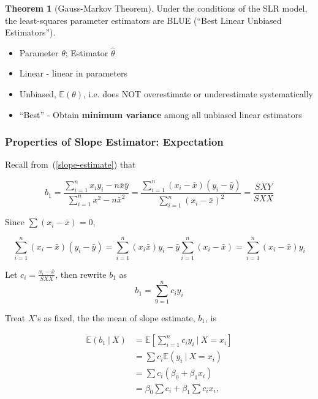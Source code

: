 \documentclass[11pt]{article}
\theoremstyle{definition}
\newtheorem{theorem}{Theorem}[section]
\numberwithin{equation}{section}
\begin{document}
\begin{theorem}[Gauss-Markov Theorem]
  Under the conditions of the SLR model, the least-squares parameter estimators are BLUE (``Best Linear Unbiased Estimators'').
  \begin{itemize}
    \item Parameter $\theta$; Estimator $\hat{\theta}$
    \item Linear - linear in parameters
    \item Unbiased, $\mathbb{E}(\theta)$, i.e. does NOT overestimate or underestimate systematically
    \item ``Best'' - Obtain \textbf{minimum variance} among all unbiased linear estimators
  \end{itemize}
\end{theorem}

\subsubsection{Properties of Slope Estimator: Expectation}

Recall from~(\ref{slope-estimate}) that

\begin{equation}
b_1 = \frac{\sum^n_{i=1}x_iy_i - n\bar{x}\bar{y}}{\sum^n_{i=1} x^2 - n\bar{x}^2}=\frac{\sum^n_{i=1}(x_i-\bar{x})(y_i-\bar{y})}{\sum^n_{i=1}(x_i-\bar{x})^2}=\frac{SXY}{SXX}
\end{equation}

Since $\sum (x_i - \bar{x}) = 0$,

\begin{equation*}
\sum^n_{i = 1} (x_i - \bar{x})(y_i - \bar{y}) = \sum^n_{i = 1}(x_i\bar{x})y_i - \bar{y}\sum^n_{i = 1}(x_i - \bar{x}) = \sum^n_{i=1}(x_i-\bar{x})y_i
\end{equation*}

Let $c_i = \frac{x_i - \bar{x}}{SXX}$, then rewrite $b_1$ as
\begin{equation}
  \boxed{b_1 = \sum^n_{9 = 1}c_iy_i}
\end{equation}

Treat $X$'s as fixed, the the mean of slope estimate, $b_1$, is

\begin{align*}
  \mathbb{E}(b_1\>|\> X) &= \mathbb{E}\left[ \sum^n_{i = 1} c_iy_i\>|\> X = x_i\right]\\
  &= \sum c_i\mathbb{E}(y_i\>|\> X = x_i)\\
  &= \sum c_i (\beta_0 + \beta_1x_i)\\
  &= \beta_0\sum c_i + \beta_1\sum c_ix_i,
\end{align*}
\end{document}
